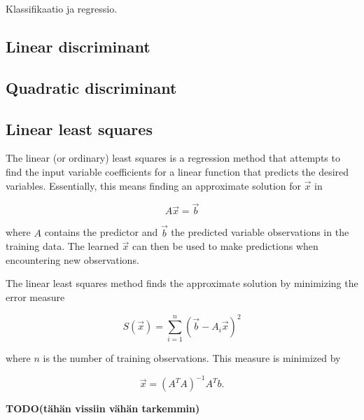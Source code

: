 \documentclass[twoside]{article}
\newcommand{\todo}[1]{\textbf{TODO(#1)}}
\renewcommand{\v}[1]{\vec{#1}}
\begin{document}
\begin{multicols}{2}
Klassifikaatio ja regressio.

\subsection{Linear discriminant}

\subsection{Quadratic discriminant}

\subsection{Linear least squares}

The linear (or ordinary) least squares is a regression method that attempts to
find the input variable coefficients for a linear function that predicts the desired variables.
Essentially, this means finding an approximate solution for $\v{x}$ in

\begin{equation*}
 A\v{x} = \v{b}
\end{equation*}

where $A$ contains the predictor and $\v{b}$ the predicted variable observations
in the training data. The learned $\v{x}$ can then be used to make predictions when encountering
new observations.

The linear least squares method finds the approximate solution by minimizing the error measure

\begin{equation}
 S(\v{x}) = \sum_{i=1}^n (\v{b} - A_i \v{x})^2
\end{equation}

where $n$ is the number of training observations. This measure is minimized by

\begin{equation}
 \v{x} = (A^T A)^{-1} A^T b.
\end{equation}

\todo{tähän vissiin vähän tarkemmin}




\end{multicols}
\end{document}
